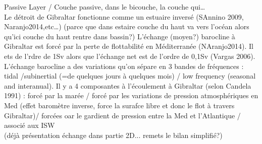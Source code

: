 Passive Layer / Couche passive, dans le bicouche, la couche qui…\\

Le détroit de Gibraltar fonctionne comme un estuaire inversé (SAnnino 2009, Naranjo2014,etc…) (parce que dans estaire couche du haut va vers l’océan alors qu’ici couche du haut rentre dans bassin?)
L’échange (moyen?) barocline à Gibraltar est forcé par la perte de flottabilité en Méditerranée (NAranjo2014). Il ets de l’rdre de 1Sv alors que l’échange net est de l’ordre de 0,1Sv (Vargas 2006). L’échange barocline a des variations qu’on sépare en 3 bandes de fréquences : tidal /subinertial (=de quelques jours à quelques mois) / low frequency (seasonal and interanual).
Il y a 4 composantes à l’écoulement à Gibraltar (selon Candela 1991) : forcé par la marée / forcé par les variations de pression atmosphériques en Med (effet baromètre inverse, force la surafce libre et donc le flot à travers Gibraltar)/ forcées oar le gardient de pression entre la Med et l’Atlantique / associé aux ISW\\



(déjà présentation échange dans partie 2D... remets le bilan simplifié?)




